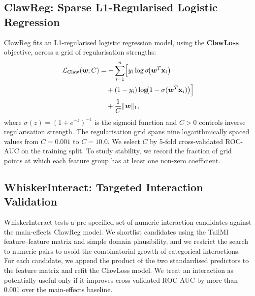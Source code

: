 \documentclass[11pt]{article}
\begin{document}
\subsection{ClawReg: Sparse L1-Regularised Logistic Regression}
\label{sec:clawreg}

ClawReg fits an L1-regularised logistic regression model, using the \textbf{ClawLoss} objective, across a grid of regularisation strengths:
\begin{align}
  \mathcal{L}_{\text{Claw}}(\boldsymbol{w}; C)
    &= -\sum_{i=1}^{n}\Bigl[
        y_i \log \sigma\!\bigl(\boldsymbol{w}^T \mathbf{x}_i\bigr)
      \notag \\
    &\quad
        + (1-y_i)\log\!\bigl(1 - \sigma(\boldsymbol{w}^T \mathbf{x}_i)\bigr)
      \Bigr] \notag \\
    &\quad + \frac{1}{C}\|\boldsymbol{w}\|_1,
  \label{eq:clawloss}
\end{align}
where $\sigma(z) = (1+e^{-z})^{-1}$ is the sigmoid function and $C > 0$ controls inverse regularisation strength. The regularisation grid spans nine logarithmically spaced values from $C = 0.001$ to $C = 10.0$. We select $C$ by 5-fold cross-validated ROC-AUC on the training split. To study stability, we record the fraction of grid points at which each feature group has at least one non-zero coefficient.

\subsection{WhiskerInteract: Targeted Interaction Validation}
\label{sec:whiskerinteract}

WhiskerInteract tests a pre-specified set of numeric interaction candidates against the main-effects ClawReg model. We shortlist candidates using the TailMI feature--feature matrix and simple domain plausibility, and we restrict the search to numeric pairs to avoid the combinatorial growth of categorical interactions. For each candidate, we append the product of the two standardised predictors to the feature matrix and refit the ClawLoss model. We treat an interaction as potentially useful only if it improves cross-validated ROC-AUC by more than 0.001 over the main-effects baseline.

\end{document}
